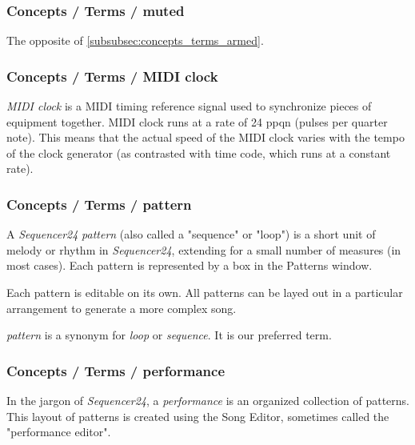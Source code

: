 \subsubsection{Concepts / Terms / muted}
\label{subsubsec:concepts_terms_muted}

   The opposite of \ref{subsubsec:concepts_terms_armed}.

\subsubsection{Concepts / Terms / MIDI clock}
\label{subsubsec:concepts_terms_midi_clock}

   \textsl{MIDI clock} is
   a MIDI timing reference signal used to synchronize pieces of equipment
   together. MIDI clock runs at a rate of 24 ppqn (pulses per quarter note).
   This means that the actual speed of the MIDI clock varies with the tempo
   of the clock generator (as contrasted with time code, which runs at a
   constant rate).

\subsubsection{Concepts / Terms / pattern}
\label{subsubsec:concepts_terms_pattern}

   A \textsl{Sequencer24} \textsl{pattern}
   (also called a "sequence" or "loop")
   is a short unit of melody or rhythm in \textsl{Sequencer24},
   extending for a small number of measures (in most cases).
   Each pattern is represented by a box in the Patterns window.

   Each pattern is editable on its own.  All patterns can be layed out in
   a particular arrangement to generate a more complex song.

   \textsl{pattern} is a synonym for \textsl{loop} or \textsl{sequence}.
   It is our preferred term.

\subsubsection{Concepts / Terms / performance}
\label{subsubsec:concepts_terms_performance}

   In the jargon of \textsl{Sequencer24}, a
   \textsl{performance} is an organized collection of patterns.
   This layout of patterns is created using the Song Editor, sometimes
   called the "performance editor".

